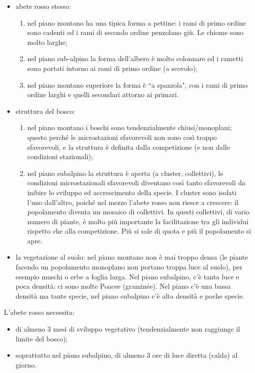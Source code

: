 \begin{itemize}[nosep]
    \item abete rosso stesso:
    \begin{enumerate}[nosep]
        \item nel piano montano ha una tipica forma a pettine: i rami di primo ordine sono cadenti ed i rami di secondo ordine penzolano giù. Le chiome sono molto larghe;
        \item nel piano sub-alpino la forma dell'albero è molto colonnare ed i rametti sono portati intorno ai rami di primo ordine (a scovolo);
        \item nel piano montano superiore la forma è ``a spazzola", con i rami di primo ordine larghi e quelli secondari attorno ai primari.
    \end{enumerate} 
    \item struttura del bosco:
    \begin{enumerate}[nosep]
        \item nel piano montano i boschi sono tendenzialmente chiusi/monoplani; questo perché le microstazioni sfavorevoli non sono così troppo sfavorevoli, e la struttura è definita dalla competizione (e non dalle condizioni stazionali);
        \item nel piano subalpino la struttura è aperta (a cluster, collettivi), le condizioni microstazionali sfavorevoli diventano così tanto sfavorevoli da inibire lo sviluppo ed accrescimento della specie. I cluster sono isolati l'uno dall'altro, poiché nel mezzo l'abete rosso non riesce a crescere: il popolamento diventa un mosaico di collettivi. In questi collettivi, di vario numero di piante, è molto più importante la facilitazione tra gli individui rispetto che alla competizione. Più si sale di quota e più il popolamento si apre.
    \end{enumerate}  
    \item la vegetazione al suolo: nel piano montano non è mai troppo densa (le piante facendo un popolamento monoplano non portano troppa luce al suolo), per esempio muschi o erbe a foglia larga. Nel piano subalpino, c'è tanta luce e poca densità: ci sono molte Poacee (graminée). Nel piano c'è una bassa densità ma tante specie, nel piano subalpino c'è alta densità e poche specie.
\end{itemize}
L'abete rosso necessita:
\begin{itemize}[nosep]
    \item di almeno 3 mesi di sviluppo vegetativo (tendenzialmente non raggiunge il limite del bosco);
    \item soprattutto nel piano subalpino, di almeno 3 ore di luce diretta (calda) al giorno.
\end{itemize}
